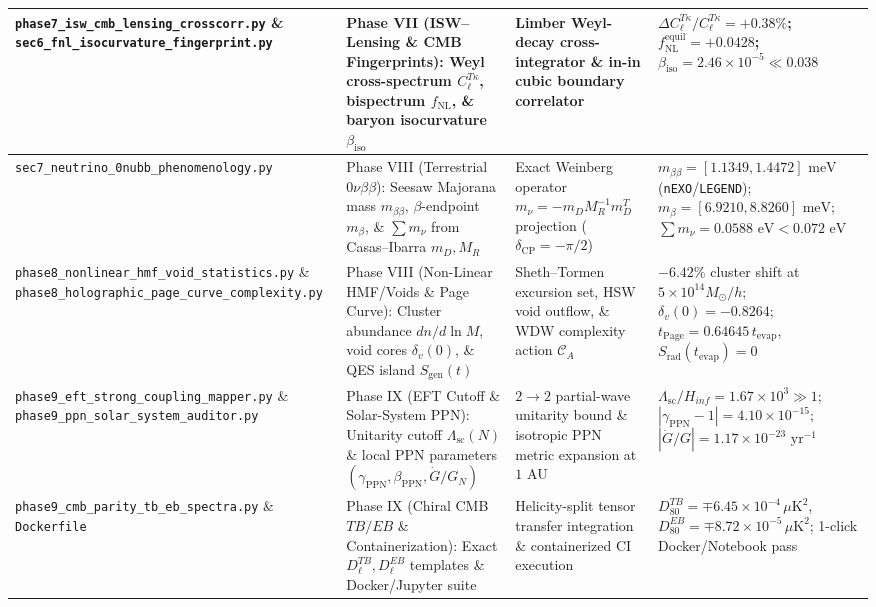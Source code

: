\documentclass[aps,prd,onecolumn,superscriptaddress,nofootinbib,longbibliography,10pt]{revtex4-2}
\begin{document}
\begin{center}
\begin{tabular}{|llll|}
  \texttt{phase7_isw_cmb_lensing_crosscorr.py} \& \texttt{sec6_fnl_isocurvature_fingerprint.py} & Phase VII (ISW–Lensing \& CMB Fingerprints): Weyl cross-spectrum \(C_\ell^{T\kappa}\), bispectrum \(f_{\mathrm{NL}}\), \& baryon isocurvature \(\beta_{\mathrm{iso}}\) & Limber Weyl-decay cross-integrator \& in-in cubic boundary correlator & \(\Delta C_\ell^{T\kappa}/C_\ell^{T\kappa} = +0.38\%\); \(f_{\mathrm{NL}}^{\mathrm{equil}} = +0.0428\); \(\beta_{\mathrm{iso}} = 2.46 \times 10^{-5} \ll 0.038\)
 \\ \hline


  \texttt{sec7_neutrino_0nubb_phenomenology.py} & Phase VIII (Terrestrial \(0\nu\beta\beta\)): Seesaw Majorana mass \(m_{\beta\beta}\), \(\beta\)-endpoint \(m_\beta\), \& \(\sum m_\nu\) from Casas–Ibarra \(m_D, M_R\) & Exact Weinberg operator \(m_\nu = -m_D M_R^{-1} m_D^T\) projection (\(\delta_{\mathrm{CP}} = -\pi/2\)) & \(m_{\beta\beta} = [1.1349, 1.4472]\text{ meV}\) (\texttt{nEXO}/\texttt{LEGEND}); \(m_\beta = [6.9210, 8.8260]\text{ meV}\); \(\sum m_\nu = 0.0588\text{ eV} < 0.072\text{ eV}\)
 \\ \hline


  \texttt{phase8_nonlinear_hmf_void_statistics.py} \& \texttt{phase8_holographic_page_curve_complexity.py} & Phase VIII (Non-Linear HMF/Voids \& Page Curve): Cluster abundance \(dn/d\ln M\), void cores \(\delta_v(0)\), \& QES island \(S_{\mathrm{gen}}(t)\) & Sheth–Tormen excursion set, HSW void outflow, \& WDW complexity action \(\mathcal{C}_A\) & \(-6.42\%\) cluster shift at \(5\times 10^{14}M_\odot/h\); \(\delta_v(0) = -0.8264\); \(t_{\mathrm{Page}} = 0.64645\,t_{\mathrm{evap}}\), \(S_{\mathrm{rad}}(t_{\mathrm{evap}})=0\)
 \\ \hline


  \texttt{phase9_eft_strong_coupling_mapper.py} \& \texttt{phase9_ppn_solar_system_auditor.py} & Phase IX (EFT Cutoff \& Solar-System PPN): Unitarity cutoff \(\Lambda_{\mathrm{sc}}(N)\) \& local PPN parameters \((\gamma_{\mathrm{PPN}}, \beta_{\mathrm{PPN}}, \dot{G}/G_N)\) & \(2 \to 2\) partial-wave unitarity bound \& isotropic PPN metric expansion at \(1\text{ AU}\) & \(\Lambda_{\mathrm{sc}}/H_{inf} = 1.67 \times 10^3 \gg 1\); \(|\gamma_{\mathrm{PPN}}-1| = 4.10 \times 10^{-15}\); \(|\dot{G}/G| = 1.17 \times 10^{-23}\text{ yr}^{-1}\)
 \\ \hline


  \texttt{phase9_cmb_parity_tb_eb_spectra.py} \& \texttt{Dockerfile} & Phase IX (Chiral CMB \(TB/EB\) \& Containerization): Exact \(D_\ell^{TB}, D_\ell^{EB}\) templates \& Docker/Jupyter suite & Helicity-split tensor transfer integration \& containerized CI execution & \(D_{80}^{TB} = \mp 6.45 \times 10^{-4}\,\mu\mathrm{K}^2\), \(D_{80}^{EB} = \mp 8.72 \times 10^{-5}\,\mu\mathrm{K}^2\); 1-click Docker/Notebook pass
 \\ \hline

    
  \end{tabular}
\end{center}
\end{document}
